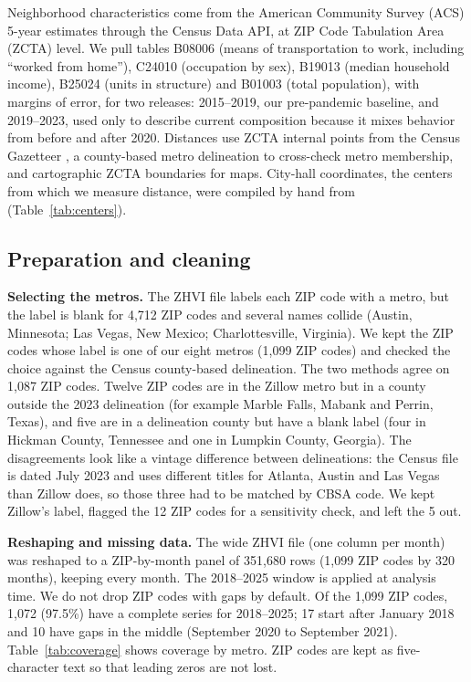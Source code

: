 \documentclass[11pt]{article}
\begin{document}
Neighborhood characteristics come from the American Community Survey (ACS) 5-year estimates \cite{acs19,acs23} through the
Census Data API, at ZIP Code Tabulation Area (ZCTA) level. We pull tables B08006 (means of transportation to work, including
``worked from home''), C24010 (occupation by sex), B19013 (median household income), B25024 (units in structure) and B01003
(total population), with margins of error, for two releases: 2015--2019, our pre-pandemic baseline, and 2019--2023, used
only to describe current composition because it mixes behavior from before and after 2020. Distances use ZCTA internal points
from the Census Gazetteer \cite{gaz}, a county-based metro delineation \cite{cbsa} to cross-check metro membership, and
cartographic ZCTA boundaries \cite{zcta} for maps. City-hall coordinates, the centers from which we measure distance, were
compiled by hand from \cite{wiki,osm} (Table~\ref{tab:centers}).

\subsection{Preparation and cleaning}
\textbf{Selecting the metros.} The ZHVI file labels each ZIP code with a metro, but the label is blank for 4,712 ZIP codes
and several names collide (Austin, Minnesota; Las Vegas, New Mexico; Charlottesville, Virginia). We kept the ZIP codes whose
label is one of our eight metros (1,099 ZIP codes) and checked the choice against the Census county-based delineation. The
two methods agree on 1,087 ZIP codes. Twelve ZIP codes are in the Zillow metro but in a county outside the 2023 delineation
(for example Marble Falls, Mabank and Perrin, Texas), and five are in a delineation county but have a blank label (four in
Hickman County, Tennessee and one in Lumpkin County, Georgia). The disagreements look like a vintage difference between
delineations: the Census file is dated July 2023 and uses different titles for Atlanta, Austin and Las Vegas than Zillow
does, so those three had to be matched by CBSA code. We kept Zillow's label, flagged the 12 ZIP codes for a sensitivity
check, and left the 5 out.

\textbf{Reshaping and missing data.} The wide ZHVI file (one column per month) was reshaped to a ZIP-by-month panel of
351,680 rows (1,099 ZIP codes by 320 months), keeping every month. The 2018--2025 window is applied at analysis time. We do
not drop ZIP codes with gaps by default. Of the 1,099 ZIP codes, 1,072 (97.5\%) have a complete series for 2018--2025; 17
start after January 2018 and 10 have gaps in the middle (September 2020 to September 2021). Table~\ref{tab:coverage}
shows coverage by metro. ZIP codes are kept as five-character text so that leading zeros are not lost.
\end{document}
